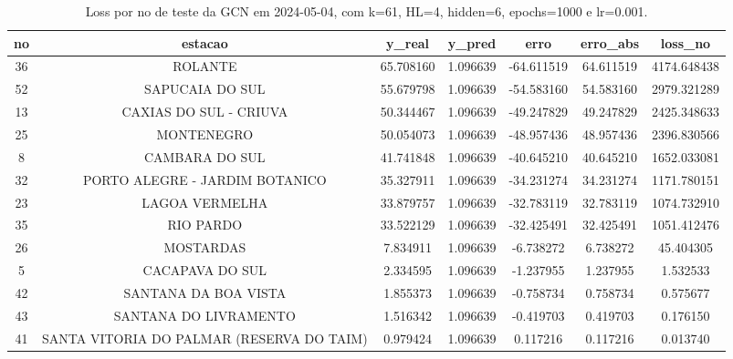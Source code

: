 \begin{table}[h]
\centering
\caption{Loss por no de teste da GCN em 2024-05-04, com k=61, HL=4, hidden=6, epochs=1000 e lr=0.001.}
\label{tab:gcn_loss_k61_hl4_h6_e1000_d20240504}
\begin{tabular}{ccccccc}
\toprule
no & estacao & y\_real & y\_pred & erro & erro\_abs & loss\_no \\
\midrule
36 & ROLANTE & 65.708160 & 1.096639 & -64.611519 & 64.611519 & 4174.648438 \\
52 & SAPUCAIA DO SUL & 55.679798 & 1.096639 & -54.583160 & 54.583160 & 2979.321289 \\
13 & CAXIAS DO SUL - CRIUVA & 50.344467 & 1.096639 & -49.247829 & 49.247829 & 2425.348633 \\
25 & MONTENEGRO & 50.054073 & 1.096639 & -48.957436 & 48.957436 & 2396.830566 \\
8 & CAMBARA DO SUL & 41.741848 & 1.096639 & -40.645210 & 40.645210 & 1652.033081 \\
32 & PORTO ALEGRE - JARDIM BOTANICO & 35.327911 & 1.096639 & -34.231274 & 34.231274 & 1171.780151 \\
23 & LAGOA VERMELHA & 33.879757 & 1.096639 & -32.783119 & 32.783119 & 1074.732910 \\
35 & RIO PARDO & 33.522129 & 1.096639 & -32.425491 & 32.425491 & 1051.412476 \\
26 & MOSTARDAS & 7.834911 & 1.096639 & -6.738272 & 6.738272 & 45.404305 \\
5 & CACAPAVA DO SUL & 2.334595 & 1.096639 & -1.237955 & 1.237955 & 1.532533 \\
42 & SANTANA DA BOA VISTA & 1.855373 & 1.096639 & -0.758734 & 0.758734 & 0.575677 \\
43 & SANTANA DO LIVRAMENTO & 1.516342 & 1.096639 & -0.419703 & 0.419703 & 0.176150 \\
41 & SANTA VITORIA DO PALMAR (RESERVA DO TAIM) & 0.979424 & 1.096639 & 0.117216 & 0.117216 & 0.013740 \\
\bottomrule
\end{tabular}
\end{table}
